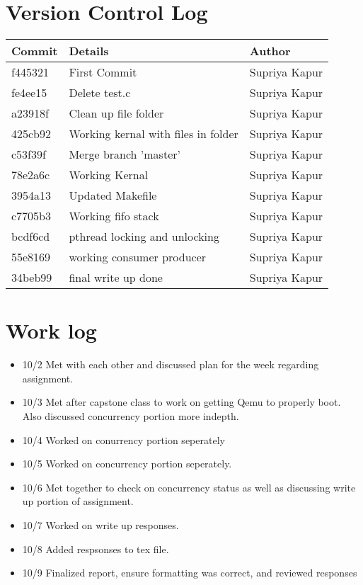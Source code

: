 \documentclass[letterpaper,onecolumn,11pt,titlepage]{IEEEtran}
\begin{document}
\section{Version Control Log}
\begin{tabular}{lll} \textbf{Commit} & \textbf{Details} & \textbf{Author}

\\ \hline
f445321&First Commit&Supriya Kapur\\ \hline
fe4ee15&Delete test.c&Supriya Kapur\\ \hline
a23918f&Clean up file folder&Supriya Kapur\\ \hline
425cb92&Working kernal with files in folder&Supriya Kapur\\ \hline
c53f39f&Merge branch 'master'&Supriya Kapur\\ \hline
78e2a6c&Working Kernal&Supriya Kapur\\ \hline
3954a13&Updated Makefile&Supriya Kapur\\ \hline
c7705b3&Working fifo stack&Supriya Kapur\\ \hline
bcdf6cd&pthread locking and unlocking&Supriya Kapur\\ \hline
55e8169&working consumer producer&Supriya Kapur\\ \hline
34beb99&final write up done&Supriya Kapur\\ \hline
\end{tabular}

\par

\section{Work log}
\par
\begin{itemize}
\item 10/2 Met with each other and discussed plan for the week regarding assignment.
\item 10/3 Met after capstone class to work on getting Qemu to properly boot. Also discussed concurrency portion more indepth.
\item 10/4 Worked on conurrency portion seperately
\item 10/5 Worked on concurrency portion seperately.
\item 10/6 Met together to check on concurrency status as well as discussing write up portion of assignment.
\item 10/7 Worked on write up responses.
\item 10/8 Added respsonses to tex file.
\item 10/9 Finalized report, ensure formatting was correct, and reviewed responses
\end{itemize}
\end{document}
